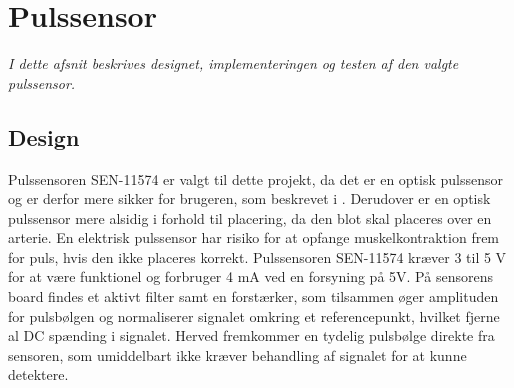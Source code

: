 \section{Pulssensor}\label{sec_design_puls}
\textit{I dette afsnit beskrives designet, implementeringen og testen af den valgte pulssensor.}

\subsection{Design}
Pulssensoren SEN-11574 er valgt til dette projekt, da det er en optisk pulssensor og er derfor mere sikker for brugeren, som beskrevet i . Derudover er en optisk pulssensor mere alsidig i forhold til placering, da den blot skal placeres over en arterie. En elektrisk pulssensor har risiko for at opfange muskelkontraktion frem for puls, hvis den ikke placeres korrekt. Pulssensoren SEN-11574 kræver 3 til 5 V for at være funktionel og forbruger 4 mA ved en forsyning på 5V. På sensorens board findes et aktivt filter samt en forstærker, som tilsammen øger amplituden for pulsbølgen og normaliserer signalet omkring et referencepunkt, hvilket fjerne al DC spænding i signalet. Herved fremkommer en tydelig pulsbølge direkte fra sensoren, som umiddelbart ikke kræver behandling af signalet for at kunne detektere. \citep{Murphy2016,Murphy2016_sensor}

